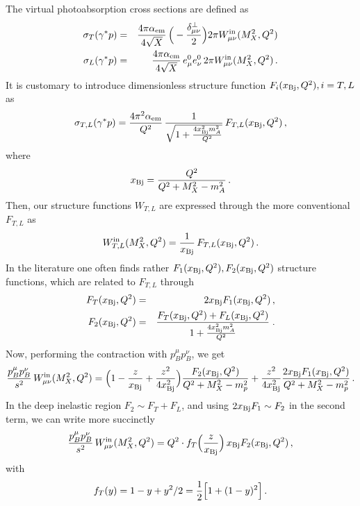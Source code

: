 The virtual photoabsorption cross sections are defined as
\begin{eqnarray}
 \sigma_T(\gamma^* p) &=& {4 \pi {\alpha_{\mathrm{em}}} \over 4 \sqrt{X}} \, \Big(- {\delta^\perp_{\mu\nu} \over 2} \Big)  2\pi W^{\rm{in}}_{\mu \nu}(M_X^2,Q^2) \nonumber \\
 \sigma_L(\gamma^* p) &=& {4 \pi {\alpha_{\mathrm{em}}} \over 4 \sqrt{X}} \, e^{0}_\mu e^{0}_\nu \, 2 \pi W^{\rm{in}}_{\mu \nu}(M_X^2,Q^2) \, .
\end{eqnarray}
It is customary to introduce dimensionless structure function $F_i(x_{\rm Bj},Q^2), i = T,L$ as
\begin{eqnarray}
 \sigma_{T,L}(\gamma^* p) = {4 \pi^2 {\alpha_{\mathrm{em}}} \over Q^2} \, {1 \over \sqrt{1 + {4 x^2_{\rm Bj} m_A^2 \over Q^2}} } \, F_{T,L}(x_{\rm Bj},Q^2) \, ,
\end{eqnarray}
where
\begin{eqnarray}
 x_{\rm Bj} = { Q^2 \over Q^2 + M_X^2 - m_A^2} \, .
\end{eqnarray}
Then, our structure functions $W_{T,L}$ are expressed through the more conventional $F_{T,L}$ as
\begin{eqnarray}
 W^{\rm{in}}_{T,L}(M_X^2,Q^2) = {1 \over x_{\rm Bj}} \, F_{T,L}(x_{\rm Bj},Q^2) \, . 
\end{eqnarray}
In the literature one often finds rather $F_1(x_{\rm Bj}, Q^2), F_2(x_{\rm Bj},Q^2)$
structure functions, which are related to $F_{T,L}$ through
\begin{eqnarray}
 F_T(x_{\rm Bj},Q^2) &=& 2x_{\rm Bj}  F_1(x_{\rm Bj},Q^2) \, , \nonumber \\
F_2(x_{\rm Bj},Q^2)  &=& { F_T(x_{\rm Bj},Q^2) +F_L(x_{\rm Bj},Q^2)
  \over 1 + {4 x^2_{\rm Bj} m_A^2 \over Q^2}} \; .
\end{eqnarray}
Now, performing the contraction with $p^\mu_B p^\nu_B$, we get
\begin{eqnarray}
  {p_B^\mu p_B^\nu \over s^2} \, W^{\rm in}_{\mu \nu}(M_X^2,Q^2) = \Big( 1 - {z \over x_{\rm Bj}} + {z^2\over 4 x_{\rm Bj}^2} \Big) {F_2(x_{\rm Bj},Q^2) \over Q^2 + M_X^2 - m_p^2} 
+ {z^2 \over 4 x^2_{\rm Bj}} { 2 x_{\rm Bj} F_1(x_{\rm Bj},Q^2) \over Q^2 + M_X^2 - m_p^2} \, .
\end{eqnarray}
In the deep inelastic region $F_2 \sim F_T + F_L$, and using $2x_{\rm Bj} F_1 \sim F_2$ in the second term, we can write more succinctly
\begin{eqnarray}
  {p_B^\mu p_B^\nu \over s^2} \, W^{\rm in}_{\mu \nu}(M_X^2,Q^2) = Q^2 \cdot f_T \Big( {z \over x_{\rm Bj}} \Big) \,  x_{\rm Bj} F_2(x_{\rm Bj},Q^2) \, ,
\end{eqnarray}
with 
\begin{eqnarray}
 f_T(y) = 1 - y + y^2/2 = {1 \over 2} \Big[ 1 + (1-y)^2 \Big] \, .
\end{eqnarray}

